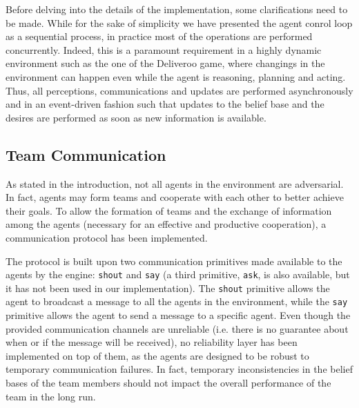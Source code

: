 Before delving into the details of the implementation, some clarifications need to be made. While for the sake of simplicity we have presented the agent conrol loop as a sequential process, in practice most of the operations are performed concurrently. Indeed, this is a paramount requirement in a highly dynamic environment such as the one of the Deliveroo game, where changings in the environment can happen even while the agent is reasoning, planning and acting. Thus, all perceptions, communications and updates are performed asynchronously and in an event-driven fashion such that updates to the belief base and the desires are performed as soon as new information is available.


\subsection{Team Communication}

As stated in the introduction, not all agents in the environment are adversarial. In fact, agents may form teams and cooperate with each other to better achieve their goals. To allow the formation of teams and the exchange of information among the agents (necessary for an effective and productive cooperation), a communication protocol has been implemented.

The protocol is built upon two communication primitives made available to the agents by the engine: \texttt{shout} and \texttt{say} (a third primitive, \texttt{ask}, is also available, but it has not been used in our implementation). The \texttt{shout} primitive allows the agent to broadcast a message to all the agents in the environment, while the \texttt{say} primitive allows the agent to send a message to a specific agent. Even though the provided communication channels are unreliable (i.e. there is no guarantee about when or if the message will be received), no reliability layer has been implemented on top of them, as the agents are designed to be robust to temporary communication failures. In fact, temporary inconsistencies in the belief bases of the team members should not impact the overall performance of the team in the long run.

